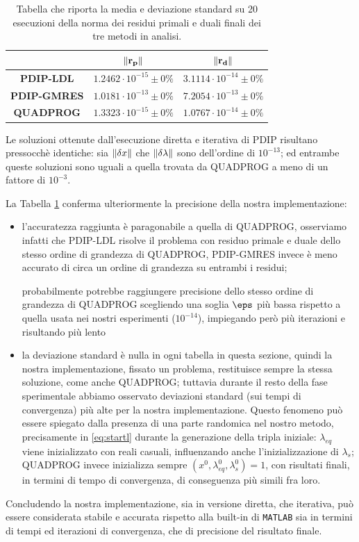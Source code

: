 \begin{table}[!h]
\centering
\begin{tabular}{c|c|c}
\textbf{}           & $\mathbf{\left\lVert r_p\right\rVert}$ & $\mathbf{\left\lVert r_d\right\rVert}$ \\\hline
\textbf{PDIP-LDL} &      $1.2462\cdot10^{-15} \pm0\%$                 &           $3.1114\cdot10^{-14} \pm0\%$             \\\hline
\textbf{PDIP-GMRES}   &        $1.0181\cdot10^{-13} \pm0\%$               &            $7.2054\cdot10^{-13} \pm0\%$           \\\hline
\textbf{QUADPROG}   &      $1.3323\cdot10^{-15} \pm0\%$                &            $1.0767\cdot10^{-14} \pm0\%$   \\    
\end{tabular}
\caption{Tabella che riporta la media e deviazione standard su 20 esecuzioni della norma dei residui primali e duali finali dei tre metodi in analisi.}
\label{tab:res}
\end{table}

Le soluzioni ottenute dall'esecuzione diretta e iterativa di PDIP risultano pressocchè identiche: sia $\left\lVert\delta x\right\rVert$ che $\left\lVert\delta\lambda\right\rVert$ sono dell'ordine di $10^{-13}$; ed entrambe queste soluzioni sono uguali a quella trovata da QUADPROG a meno di un fattore di $10^{-3}$.

La Tabella \ref{tab:res} conferma ulteriormente la precisione della nostra implementazione: 
\begin{itemize}
    \item l'accuratezza raggiunta è paragonabile a quella di QUADPROG, osserviamo infatti che PDIP-LDL risolve il problema con residuo primale e duale dello stesso ordine di grandezza di QUADPROG, PDIP-GMRES invece è meno accurato di circa un ordine di grandezza su entrambi i residui;
    
    probabilmente potrebbe raggiungere precisione dello stesso ordine di grandezza di QUADPROG scegliendo una soglia $\eps$ più bassa rispetto a quella usata nei nostri esperimenti ($10^{-14}$), impiegando però più iterazioni e risultando più lento
    \item la deviazione standard è nulla in ogni tabella in questa sezione, quindi la nostra implementazione, fissato un problema, restituisce sempre la stessa soluzione, come anche QUADPROG; tuttavia durante il resto della fase sperimentale abbiamo osservato deviazioni standard (sui tempi di convergenza) più alte per la nostra implementazione. Questo fenomeno può essere spiegato dalla presenza di una parte randomica nel nostro metodo, precisamente in \ref{eq:startl} durante la generazione della tripla iniziale: $\lambda_{eq}$ viene inizializzato con reali casuali, influenzando anche l'inizializzazione di $\lambda_s$; QUADPROG invece inizializza sempre $(x^0, \lambda_{eq}^0, \lambda_s^0) = 1$, con risultati finali, in termini di tempo di convergenza, di conseguenza più simili fra loro.
\end{itemize}

Concludendo la nostra implementazione, sia in versione diretta, che iterativa, può essere considerata stabile e accurata rispetto alla built-in di \texttt{MATLAB} sia in termini di tempi ed iterazioni di convergenza, che di precisione del risultato finale.